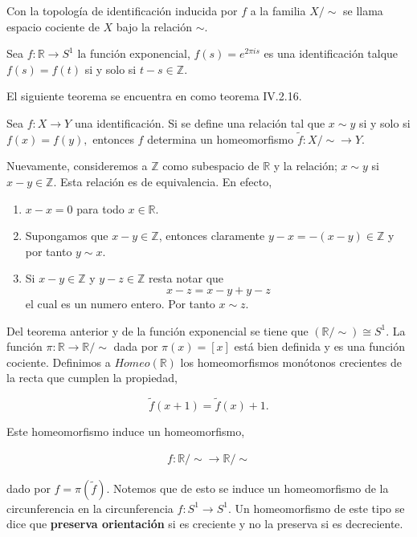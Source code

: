 \begin{df}
Con la topología de identificación inducida por $f$ a la familia $X/ \sim$ se llama espacio cociente de $X$ bajo la relación $\sim$. 
\end{df}

\begin{ej}
Sea $f: \mathbb{R} \to S^1$ la función exponencial, $f(s)=e^{2\pi i s}$ es una identificación talque $f(s)=f(t)$ si y solo si $t-s \in \mathbb{Z}$.
\end{ej}

El siguiente teorema se encuentra en \cite{top_prieto} como teorema IV.2.16.

\begin{te} 
Sea $f:X \to Y$ una identificación. Si se define una relación tal que $x \sim y$ si y solo si $f(x)=f(y),$ entonces $f$ determina un homeomorfismo $\tilde{f}:X/ \sim \to Y.$
\end{te}


\begin{ej}\label{ej:Cir_un_coc}
Nuevamente, consideremos a $\mathbb{Z}$ como subespacio de $\mathbb{R}$ y la relación; $x \sim y$ si $x-y \in \mathbb{Z}$. Esta relación es de equivalencia. En efecto, 

\begin{enumerate}
	\item $x-x=0 $ para todo $x \in \mathbb{R}$.
	\item Supongamos que $x-y \in \mathbb{Z}$, entonces claramente $y-x=-(x-y) \in \mathbb{Z}$ y por tanto $y \sim x$.
	\item Si $x-y \in \mathbb{Z}$ y $y-z \in \mathbb{Z}$ resta notar que $$x-z=x-y+y-z$$
el cual es un numero entero. Por tanto $x \sim z$.
	\end{enumerate}


Del teorema anterior y de la función exponencial se tiene que $(\mathbb{R}/\sim) \cong S^1.$ La función  $\pi: \mathbb{R} \to \mathbb{R}/ \sim$ dada por $\pi (x)=[x]$ está bien definida y es una función cociente. Definimos a $Homeo(\mathbb{R})$ los homeomorfismos monótonos crecientes de la recta que cumplen la propiedad, 

$$\tilde{f}(x+1)= \tilde{f}(x)+1.$$

Este homeomorfismo induce un homeomorfismo,

\begin{align*}
f:\mathbb{R}/ \sim \to  \mathbb{R}/ \sim
\end{align*}
 
dado por $f=\pi(\tilde{f}).$ Notemos que de esto se induce un homeomorfismo de la circunferencia en la circunferencia $f:S^1 \to S^1$. Un homeomorfismo de este tipo se dice que \textbf{preserva orientación} si es creciente y no la preserva si es decreciente. 
\end{ej}

